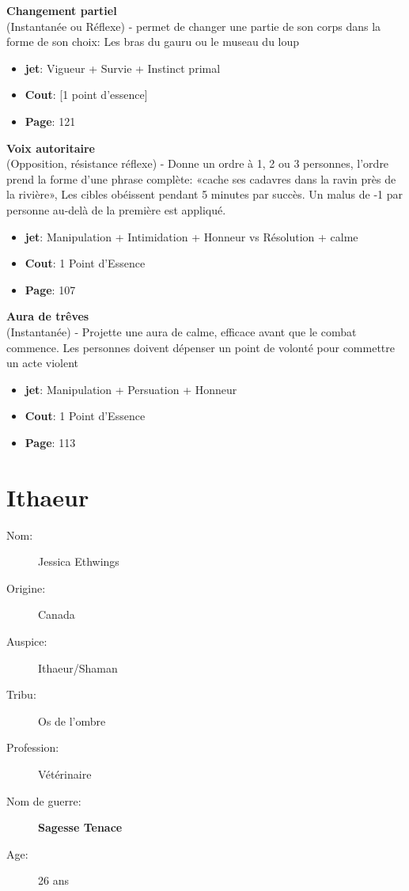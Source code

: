 \documentclass[oneside,12pt]{book}
\newcommand\don[6]{
\textbf{#1} \\
(#6) - #2
\begin{itemize}
\item{ \textbf{jet}: #3}
\item{ \textbf{Cout}: #4}
\item{ \textbf{Page}: #5}
\end{itemize}
\vspace{0.5cm}
}
\newcommand{\Jessica}{\textbf{Sagesse Tenace} }
\begin{document}
\begin{flushleft}
\don{Changement partiel}{permet de changer une partie de son corps dans la forme de son choix: Les bras du gauru ou le museau du loup}{Vigueur + Survie + Instinct primal}{[1 point d'essence]}{121}{Instantanée ou Réflexe}
\don{Voix autoritaire}{Donne un ordre à 1, 2 ou 3 personnes, l'ordre prend la forme d'une phrase complète: «cache ses cadavres dans la ravin près de la rivière», Les cibles obéissent pendant 5 minutes par succès. Un malus de -1 par personne au-delà de la première est appliqué.}{ Manipulation + Intimidation + Honneur vs Résolution + calme}{1 Point d'Essence}{107}{Opposition, résistance réflexe}
\don{Aura de trêves}{Projette une aura de calme, efficace avant que le combat commence. Les personnes doivent dépenser un point de volonté pour commettre un acte violent}{Manipulation + Persuation + Honneur}{1 Point d'Essence}{113}{Instantanée}


\clearpage
\section{Ithaeur}
\begin{description}
\item[Nom:]{Jessica Ethwings}
\item[Origine:]{Canada}
\item[Auspice:]{Ithaeur/Shaman}
\item[Tribu:]{Os de l'ombre}
\item[Profession:]{Vétérinaire}
\item[Nom de guerre:]{\Jessica}
\item[Age:]{26 ans}


\end{description}
\end{flushleft}
\end{document}
